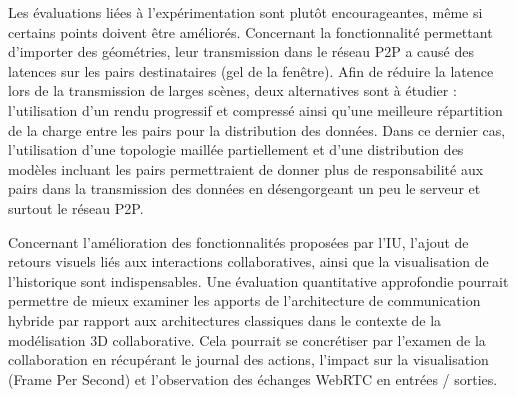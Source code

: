 Les évaluations liées à l'expérimentation sont plutôt encourageantes, même si 
certains points doivent être améliorés. Concernant la fonctionnalité permettant 
d'importer des géométries, leur transmission dans le réseau \gls{P2P} a causé 
des latences sur les pairs destinataires (gel de la fenêtre). 
Afin de réduire la latence lors de la transmission de larges scènes, deux alternatives 
sont à étudier : l'utilisation d'un 
rendu progressif et compressé ainsi qu'une meilleure répartition de la charge entre 
les pairs pour la distribution des données. Dans ce dernier cas, l'utilisation d'une 
topologie maillée partiellement et d'une distribution des modèles incluant les pairs 
permettraient de donner plus de responsabilité aux pairs dans la transmission des 
données en désengorgeant
un peu le serveur et surtout le réseau \gls{P2P}.

Concernant l'amélioration des fonctionnalités proposées par l'\gls{IU}, 
l'ajout de retours visuels liés aux interactions collaboratives, 
ainsi que la visualisation de l'historique sont 
indispensables. Une évaluation quantitative approfondie pourrait permettre de 
mieux examiner les apports de l'architecture de communication hybride par rapport 
aux architectures classiques dans le contexte de la modélisation \gls{3D} 
collaborative. 
Cela pourrait se concrétiser par l'examen de la collaboration en récupérant le 
journal des actions, l'impact sur la visualisation (Frame Per Second) et 
l'observation des échanges WebRTC en entrées / sorties.

